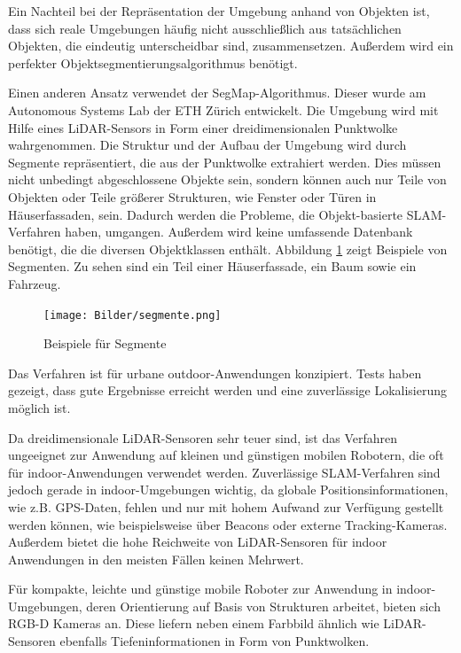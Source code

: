Ein Nachteil bei der Repräsentation der Umgebung anhand von Objekten ist, dass sich reale Umgebungen häufig nicht ausschließlich aus tatsächlichen Objekten, die eindeutig unterscheidbar sind, zusammensetzen. Außerdem wird ein perfekter Objektsegmentierungsalgorithmus benötigt. 

Einen anderen Ansatz verwendet der SegMap-Algorithmus. Dieser wurde am Autonomous Systems Lab der ETH Zürich entwickelt. Die Umgebung wird mit Hilfe eines LiDAR-Sensors in Form einer dreidimensionalen Punkt\-wol\-ke wahrgenommen. Die Struktur und der Aufbau der Umgebung wird durch Segmente repräsentiert, die aus der Punkt\-wol\-ke extrahiert werden. Dies müssen nicht unbedingt abgeschlossene Objekte sein, sondern können auch nur Teile von Objekten oder Teile größerer Strukturen, wie Fenster oder Türen in Häuserfassaden, sein. Dadurch werden die Pro\-bleme, die Objekt-basierte SLAM-Verfahren haben, umgangen. Außerdem wird keine umfassende Datenbank benötigt, die die diversen Objektklassen enthält. Abbildung \ref{fig:segmente} zeigt Beispiele von Segmenten. Zu sehen sind ein Teil einer Häuserfassade, ein Baum sowie ein Fahrzeug.

\begin{figure}
    \centering
    \texttt{[image: Bilder/segmente.png]}
    \caption[Beispiele für Segmente]{Beispiele für Segmente \cite{Dube2017a}}
    \label{fig:segmente}
\end{figure}

Das Verfahren ist für urbane outdoor-Anwendungen konzipiert. Tests haben gezeigt, dass gute Ergebnisse erreicht werden und eine zuverlässige Lokalisierung möglich ist.

Da dreidimensionale LiDAR-Sensoren sehr teuer sind, ist das Verfahren ungeeignet zur Anwendung auf kleinen und günstigen mobilen Robotern, die oft für indoor-Anwendungen verwendet werden. Zuverlässige SLAM-Verfahren sind jedoch gerade in indoor-Umgebungen wichtig, da globale  Positionsinformationen, wie z.B. GPS-Daten, fehlen und nur mit hohem Aufwand zur Verfügung gestellt werden können, wie beispielsweise über Beacons oder externe Tracking-Kameras. Außerdem bietet die hohe Reichweite von LiDAR-Sensoren für indoor Anwendungen in den meisten Fällen keinen Mehrwert. 

Für kompakte, leichte und günstige mobile Roboter zur Anwendung in indoor-Um\-ge\-bung\-en, deren Orientierung auf Basis von Strukturen arbeitet, bieten sich RGB-D Kameras an. Diese liefern neben einem Farbbild ähnlich wie LiDAR-Sensoren ebenfalls Tiefeninformationen in Form von Punktwolken. 

